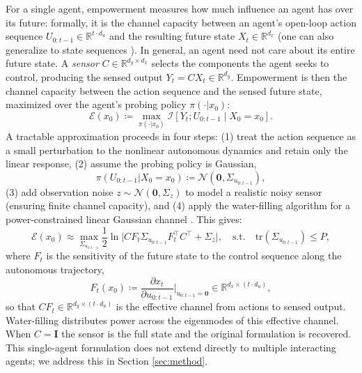 \documentclass{article} %
\begin{document}
For a single agent, empowerment \citep{klyubin2005empowerment,
salge2014empowerment} measures how much influence an agent has over
its future: formally, it is the channel capacity between an agent's
open-loop action sequence $U_{0:t-1} \in \mathbb{R}^{t \cdot d_u}$
and the resulting future state $X_t \in \mathbb{R}^{d_x}$ (one can
also generalize to state sequences \citep{tiomkin_2024}).
In general, an agent need not care about its entire future state. A
\emph{sensor} $C \in \mathbb{R}^{d_y \times d_x}$ selects the
components the agent seeks to control, producing the sensed output
$Y_t = CX_t \in \mathbb{R}^{d_y}$. Empowerment is then the channel
capacity between the action sequence and the sensed future state,
maximized over the agent's probing policy $\pi(\cdot | x_0)$:
\begin{equation*}
    \mathcal{E}(x_0) \coloneq \max_{\pi(\cdot |x_0)}
    \mathcal{I}[Y_t; U_{0:t-1} \mid X_0 = x_0].
\end{equation*}
A tractable approximation proceeds in four steps: (1) treat the
action sequence as a small perturbation to the nonlinear autonomous
dynamics and retain only the linear response, (2) assume the probing
policy is Gaussian,
\begin{equation*}
    \pi(U_{0:t-1} | X_0 = x_0) \coloneq \mathcal{N}(\mathbf{0},
    \Sigma_{u_{0:t-1}}),
\end{equation*}
(3) add observation noise $z \sim \mathcal{N}(\mathbf{0}, \Sigma_z)$
to model a realistic noisy sensor (ensuring finite channel capacity),
and (4) apply the water-filling algorithm for a power-constrained
linear Gaussian channel \citep{cover1999elements}. This gives:
\begin{equation*}
    \mathcal{E}(x_0) \approx \max_{\Sigma_{u_{0:t-1}}} \frac{1}{2}
    \ln \big| CF_t \Sigma_{u_{0:t-1}} F_t^\top C^\top +
    \Sigma_z \big|, \quad \textrm{s.t.} \quad
    \mathrm{tr}(\Sigma_{u_{0:t-1}}) \leq P,
\end{equation*}
where $F_t$ is the sensitivity of the future state to the control
sequence along the autonomous trajectory,
\begin{equation*}
    F_t(x_0) \coloneq \frac{\partial x_t}{\partial
    u_{0:t-1}}\bigg|_{u_{0:t-1} = \mathbf{0}} \in \mathbb{R}^{d_x
    \times (t \cdot d_u)},
\end{equation*}
so that $CF_t \in \mathbb{R}^{d_y \times (t \cdot d_u)}$ is the
effective channel from actions to sensed output. Water-filling
distributes power across the eigenmodes of this effective channel.
When $C = \mathbf{I}$ the sensor is the full state and the original
formulation is recovered. This single-agent formulation does not
extend directly to multiple interacting agents; we address this in Section \ref{sec:method}.
\end{document}
